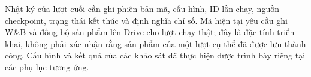 \documentclass[14pt,a4paper,oneside]{extreport}
\begin{document}
Nhật ký của lượt cuối cần ghi phiên bản mã, cấu hình, ID lần chạy,
nguồn checkpoint, trạng thái kết thúc và định nghĩa chỉ số. Mã hiện
tại yêu cầu ghi W\&B và đồng bộ sản phẩm lên Drive cho lượt chạy thật;
đây là đặc tính triển khai, không phải xác nhận rằng sản phẩm của một
lượt cụ thể đã được lưu thành công. Cấu hình và kết quả của các khảo
sát đã thực hiện được trình bày riêng tại các phụ lục tương ứng.

%
%
%
%
\end{document}
